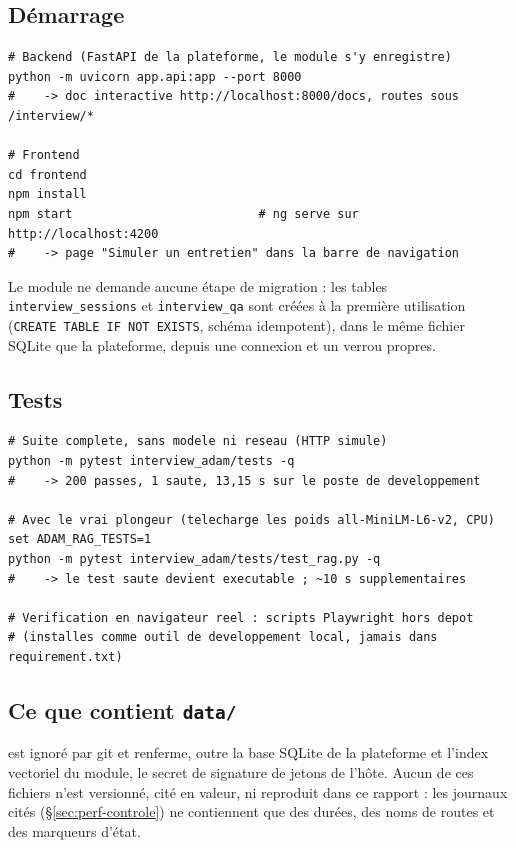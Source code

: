 \subsection{Démarrage}

\begin{lstlisting}[style=adamshell]
# Backend (FastAPI de la plateforme, le module s'y enregistre)
python -m uvicorn app.api:app --port 8000
#    -> doc interactive http://localhost:8000/docs, routes sous /interview/*

# Frontend
cd frontend
npm install
npm start                          # ng serve sur http://localhost:4200
#    -> page "Simuler un entretien" dans la barre de navigation
\end{lstlisting}

Le module ne demande aucune étape de migration : les tables
\texttt{interview\_sessions} et \texttt{interview\_qa} sont créées à la première
utilisation (\texttt{CREATE TABLE IF NOT EXISTS}, schéma idempotent), dans le même
fichier SQLite que la plateforme, depuis une connexion et un verrou propres.

\subsection{Tests}

\begin{lstlisting}[style=adamshell]
# Suite complete, sans modele ni reseau (HTTP simule)
python -m pytest interview_adam/tests -q
#    -> 200 passes, 1 saute, 13,15 s sur le poste de developpement

# Avec le vrai plongeur (telecharge les poids all-MiniLM-L6-v2, CPU)
set ADAM_RAG_TESTS=1
python -m pytest interview_adam/tests/test_rag.py -q
#    -> le test saute devient executable ; ~10 s supplementaires

# Verification en navigateur reel : scripts Playwright hors depot
# (installes comme outil de developpement local, jamais dans requirement.txt)
\end{lstlisting}

\subsection{Ce que contient \texttt{data/}}

 est ignoré par git et renferme, outre la base SQLite de la
plateforme et l'index vectoriel du module, le secret de signature de jetons de
l'hôte. Aucun de ces fichiers n'est versionné, cité en valeur, ni reproduit dans
ce rapport : les journaux cités (§\ref{sec:perf-controle}) ne contiennent que des
durées, des noms de routes et des marqueurs d'état.

